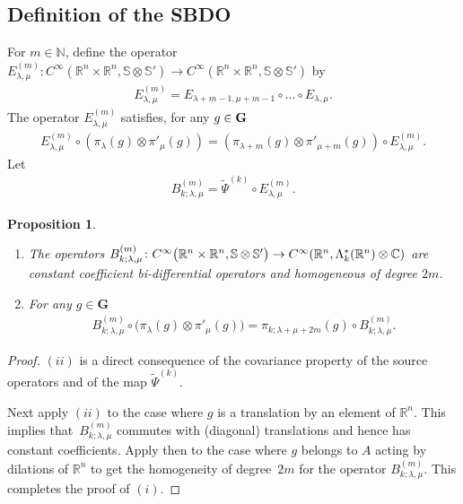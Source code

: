 \documentclass[10pt,a4paper]{amsart}
\numberwithin{equation}{section}
\newtheorem{prop}[theor]{Proposition}
\begin{document}
\subsection{Definition of the SBDO}
For $m\in \mathbb N$, define the operator $E_{\lambda, \mu}^{(m)} \colon C^\infty(\mathbb R^n \times \mathbb R^n, \mathbb S\otimes \mathbb S')\to C^\infty(\mathbb R^n \times \mathbb R^n, \mathbb S\otimes \mathbb S')$ by
\begin{gather*}
E_{\lambda, \mu}^{(m)}=E_{\lambda+m-1, \mu+m-1}\circ \dots \circ E_{\lambda, \mu}.
\end{gather*}
The operator $E_{\lambda, \mu}^{(m)}$ satisfies, for any $g\in \bf G$
\begin{gather}\label{covEm}
E_{\lambda, \mu}^{(m)}\circ \left(\pi_\lambda(g) \otimes \pi'_\mu(g) \right)= \left(\pi_{\lambda+m}(g) \otimes \pi'_{\mu+m}(g)\right)\circ E_{\lambda, \mu}^{(m)}.
\end{gather}
Let
\begin{gather*}
B_{k;\lambda, \mu}^{(m)}= \widetilde \Psi^{(k)} \circ E_{\lambda, \mu}^{(m)}.
\end{gather*}

\begin{prop} \quad
\begin{enumerate}\itemsep=0pt
\item[$(i)$] The operators $B_{k;\lambda, \mu}^{(m)} \colon C^\infty\big(\mathbb R^n\times \mathbb R^n, \mathbb S\otimes \mathbb S'\big)\rightarrow C^\infty(\mathbb R^n, \Lambda^*_k(\mathbb R^n)\otimes \nobreak \mathbb C)$ are constant coefficient bi-differential operators and homogeneous of degree $2m$.

\item[$(ii)$] For any $g\in \mathbf G$
\begin{gather*}
B_{k;\lambda, \mu}^{(m)}\circ \big(\pi_\lambda(g) \otimes \pi'_\mu(g)\big)= \pi_{k;\lambda+\mu+2m}(g)\circ B_{k;\lambda, \mu}^{(m)}.
\end{gather*}
\end{enumerate}
\end{prop}
\begin{proof}
$(ii)$ is a direct consequence of the covariance property of the source operators and of the map $\widetilde \Psi^{(k)}$.

Next apply $(ii)$ to the case where $g$ is a translation by an element of $\mathbb R^n$. This implies that~$B^{(m)}_{k;\lambda,\mu}$ commutes with (diagonal) translations and hence has constant coefficients. Apply then to the case where $g$ belongs to $A$ acting by dilations of $\mathbb R^n$ to get the homogeneity of degree~$2m$ for the operator $B^{(m)}_{k;\lambda,\mu}$. This completes the proof of $(i)$.
\end{proof}
\end{document}
